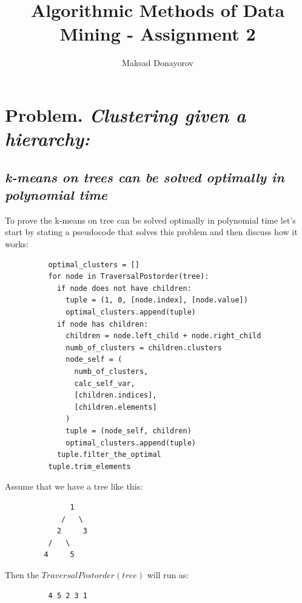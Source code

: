 \documentclass[11pt,a4paper,english]{article}
\title{Algorithmic Methods of Data Mining - Assignment 2}
\author{Maksad Donayorov}
\begin{document}
    \maketitle

    \section{Problem. \textit{Clustering given a hierarchy:}}
      \subsection{
        \textit{k-means on trees can be solved optimally in polynomial time}
      }
        To prove the k-means on tree can be solved optimally in polynomial time let's start by stating a pseudocode that solves this problem and then discuss how it works:
        \begin{verbatim}
          optimal_clusters = []
          for node in TraversalPostorder(tree):
            if node does not have children:
              tuple = (1, 0, [node.index], [node.value])
              optimal_clusters.append(tuple)
            if node has children:
              children = node.left_child + node.right_child
              numb_of_clusters = children.clusters
              node_self = (
                numb_of_clusters,
                calc_self_var,
                [children.indices],
                [children.elements]
              )
              tuple = (node_self, children)
              optimal_clusters.append(tuple)
            tuple.filter_the_optimal
          tuple.trim_elements
        \end{verbatim}

        Assume that we have a tree like this:
        \begin{verbatim}
               1
             /   \
            2     3
          /   \
         4     5
        \end{verbatim}
        Then the $TraversalPostorder(tree)$ will run as:
        \begin{verbatim}
          4 5 2 3 1
        \end{verbatim}
\end{document}
